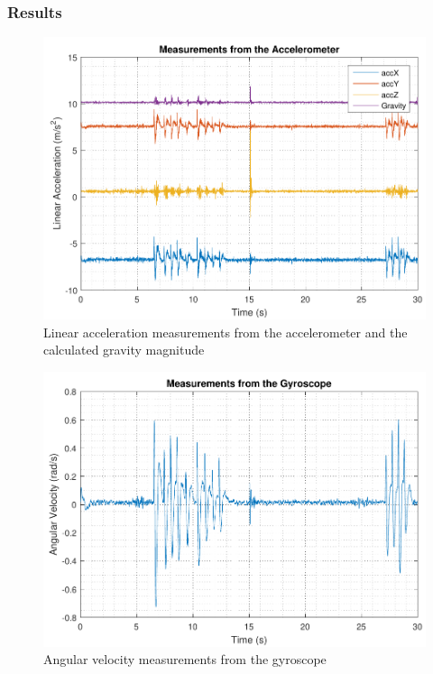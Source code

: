 \subsubsection{Results}

\begin{figure}[H]
	\includegraphics[scale=.75]{figures/accData}
	\centering
	\caption{Linear acceleration measurements from the accelerometer and the calculated gravity magnitude}
\end{figure} \label{accData}
%
\begin{figure}[H]
	\includegraphics[scale=.75]{figures/gyroData}
	\centering
	\caption{Angular velocity measurements from the gyroscope}
\end{figure} \label{gyroData}
%
